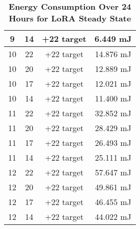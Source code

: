 \begin{table*}[ht!]
\begin{tabularx}{\columnwidth}{c c c c}
    9 & 14 & +22 target & 6.449 mJ \\
    \midrule
    10 & 22 & +22 target & 14.876 mJ \\
    10 & 20 & +22 target & 12.889 mJ \\
    10 & 17 & +22 target & 12.021 mJ \\
    10 & 14 & +22 target & 11.400 mJ \\
    \midrule
    11 & 22 & +22 target & 32.852 mJ \\
    11 & 20 & +22 target & 28.429 mJ \\
    11 & 17 & +22 target & 26.493 mJ \\
    11 & 14 & +22 target & 25.111 mJ \\
    \midrule
    12 & 22 & +22 target & 57.647 mJ \\
    12 & 20 & +22 target & 49.861 mJ \\
    12 & 17 & +22 target & 46.455 mJ \\
    12 & 14 & +22 target & 44.022 mJ \\
    \bottomrule
    \end{tabularx}
    \caption{\textbf{Energy Consumption Over 24 Hours for LoRA Steady State}}
    \label{tab:lora_power_revised}
\end{table*}